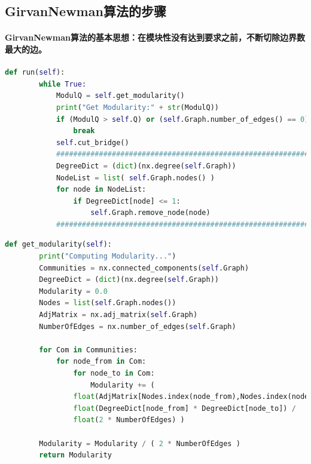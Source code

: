 \documentclass{ctexart}
\begin{document}
    \subsection{GirvanNewman算法的步骤}
    \paragraph{GirvanNewman算法的基本思想：在模块性没有达到要求之前，不断切除边界数最大的边。\\}
    \begin{lstlisting}[language=python, basicstyle=\small,keywordstyle=\color{blue!100},commentstyle=\color{red!100!},frame=shadowbox, rulesepcolor=\color{red!20!green!20!blue!20}]
        def run(self):
        while True:
            ModulQ = self.get_modularity()
            print("Get Modularity:" + str(ModulQ))
            if (ModulQ > self.Q) or (self.Graph.number_of_edges() == 0):
                break
            self.cut_bridge()
            #############################################################
            DegreeDict = (dict)(nx.degree(self.Graph))
            NodeList = list( self.Graph.nodes() )
            for node in NodeList:
                if DegreeDict[node] <= 1:
                    self.Graph.remove_node(node)
            #############################################################
    \end{lstlisting}
    \begin{lstlisting}[language=python, basicstyle=\small,keywordstyle=\color{blue!100},commentstyle=\color{red!100!},frame=shadowbox, rulesepcolor=\color{red!20!green!20!blue!20}]
        def get_modularity(self):
        print("Computing Modularity...")
        Communities = nx.connected_components(self.Graph)
        DegreeDict = (dict)(nx.degree(self.Graph))
        Modularity = 0.0
        Nodes = list(self.Graph.nodes())
        AdjMatrix = nx.adj_matrix(self.Graph)
        NumberOfEdges = nx.number_of_edges(self.Graph)
        
        for Com in Communities:
            for node_from in Com:
                for node_to in Com:
                    Modularity += ( 
                float(AdjMatrix[Nodes.index(node_from),Nodes.index(node_to)]) - 
                float(DegreeDict[node_from] * DegreeDict[node_to]) / 
                float(2 * NumberOfEdges) )

        Modularity = Modularity / ( 2 * NumberOfEdges )
        return Modularity
    \end{lstlisting}
\end{document}
